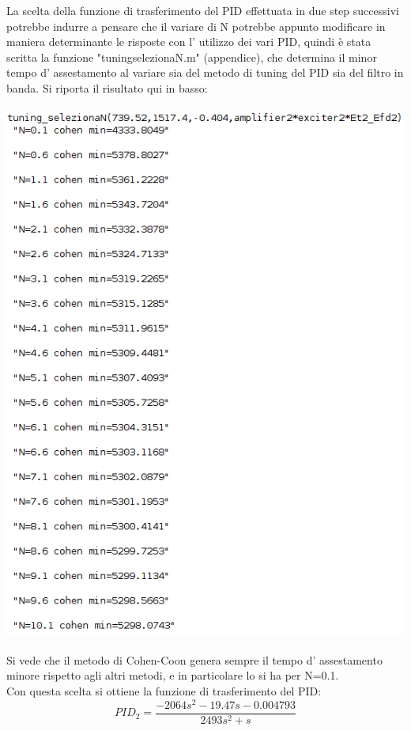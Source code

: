 \documentclass[Lau,noexaminfo]{sapthesis}
\begin{document}
	La scelta della funzione di trasferimento del PID effettuata in due step successivi potrebbe indurre a pensare che il variare di N potrebbe appunto modificare in maniera determinante le risposte con l' utilizzo dei vari PID, quindi è stata scritta la funzione "tuning\textunderscore selezionaN.m" (appendice), che determina il minor tempo d' assestamento al variare sia del metodo di tuning del PID sia del filtro in banda. Si riporta il risultato qui in basso:\\\\
	\includegraphics[scale=0.5]{tuning_selezionaN_P2} \\\\
	Si vede che il metodo di Cohen-Coon genera sempre il tempo d' assestamento minore rispetto agli altri metodi, e in particolare lo si ha per N=0.1.\\
	Con questa scelta si ottiene la funzione di trasferimento del PID:
	\begin{equation*}
	PID_2=\frac{-2064s^2-19.47s-0.004793}{2493s^2+s}
	\end{equation*}
\end{document}
